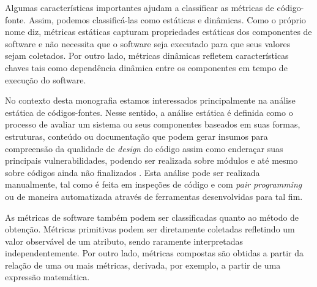 %

Algumas características importantes ajudam a classificar as métricas de código-fonte. Assim, podemos classificá-las como estáticas e dinâmicas. Como o próprio nome diz, métricas estáticas capturam propriedades estáticas dos componentes de software e não necessita que o software seja executado para que seus valores sejam coletados. Por outro lado, métricas dinâmicas refletem características chaves tais como dependência dinâmica entre os componentes em tempo de execução do software.

%

No contexto desta monografia estamos interessados principalmente na análise estática de códigos-fontes. Nesse sentido, a análise estática é definida como o processo de avaliar um sistema ou seus componentes baseados em suas formas, estruturas, conteúdo ou documentação que podem gerar insumos para compreensão da qualidade de \emph{design} do código assim como enderaçar suas principais vulnerabilidades, podendo ser realizada sobre módulos e até mesmo sobre códigos ainda não finalizados \cite{black2009}. Esta análise pode ser realizada manualmente, tal como é feita em inspeções de código e com \emph{pair programming} ou de maneira automatizada através de ferramentas desenvolvidas para tal fim.

%

As métricas de software também podem ser classificadas quanto ao método de obtenção. Métricas primitivas podem ser diretamente coletadas refletindo um valor observável de um atributo, sendo raramente interpretadas independentemente. Por outro lado, métricas compostas são obtidas a partir da relação de uma ou mais métricas, derivada, por exemplo, a partir de uma expressão matemática.

%

